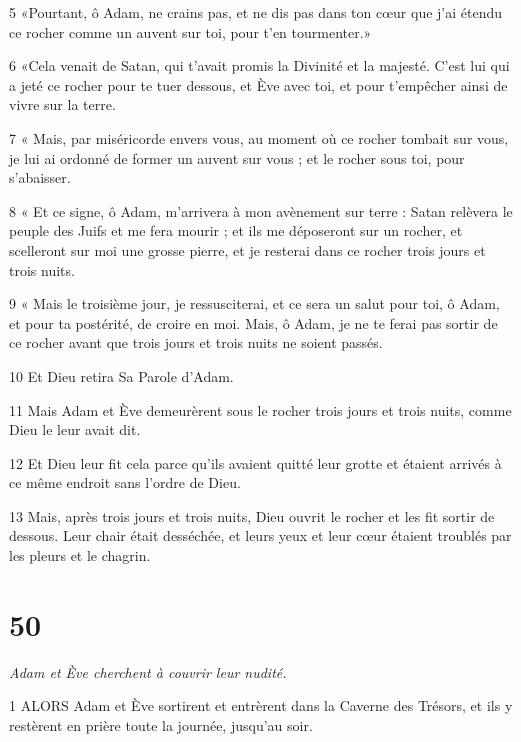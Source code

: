 \par 5 «Pourtant, ô Adam, ne crains pas, et ne dis pas dans ton cœur que j'ai étendu ce rocher comme un auvent sur toi, pour t'en tourmenter.»

\par 6 «Cela venait de Satan, qui t'avait promis la Divinité et la majesté. C'est lui qui a jeté ce rocher pour te tuer dessous, et Ève avec toi, et pour t'empêcher ainsi de vivre sur la terre.

\par 7 « Mais, par miséricorde envers vous, au moment où ce rocher tombait sur vous, je lui ai ordonné de former un auvent sur vous ; et le rocher sous toi, pour s'abaisser.

\par 8 « Et ce signe, ô Adam, m'arrivera à mon avènement sur terre : Satan relèvera le peuple des Juifs et me fera mourir ; et ils me déposeront sur un rocher, et scelleront sur moi une grosse pierre, et je resterai dans ce rocher trois jours et trois nuits.

\par 9 « Mais le troisième jour, je ressusciterai, et ce sera un salut pour toi, ô Adam, et pour ta postérité, de croire en moi. Mais, ô Adam, je ne te ferai pas sortir de ce rocher avant que trois jours et trois nuits ne soient passés.

\par 10 Et Dieu retira Sa Parole d'Adam.

\par 11 Mais Adam et Ève demeurèrent sous le rocher trois jours et trois nuits, comme Dieu le leur avait dit.

\par 12 Et Dieu leur fit cela parce qu'ils avaient quitté leur grotte et étaient arrivés à ce même endroit sans l'ordre de Dieu.

\par 13 Mais, après trois jours et trois nuits, Dieu ouvrit le rocher et les fit sortir de dessous. Leur chair était desséchée, et leurs yeux et leur cœur étaient troublés par les pleurs et le chagrin.

\chapter{50}

\par \textit{Adam et Ève cherchent à couvrir leur nudité.}

\par 1 ALORS Adam et Ève sortirent et entrèrent dans la Caverne des Trésors, et ils y restèrent en prière toute la journée, jusqu'au soir.

